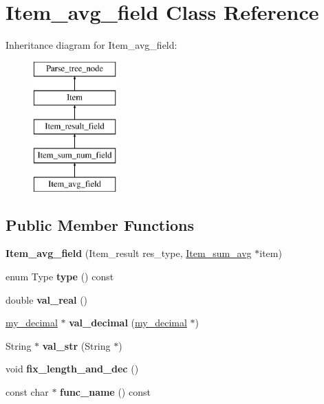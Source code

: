 \hypertarget{classItem__avg__field}{}\section{Item\+\_\+avg\+\_\+field Class Reference}
\label{classItem__avg__field}
Inheritance diagram for Item\+\_\+avg\+\_\+field\+:\begin{figure}[H]
\begin{center}
\leavevmode
\includegraphics[height=5.000000cm]{classItem__avg__field}
\end{center}
\end{figure}
\subsection*{Public Member Functions}
\begin{DoxyCompactItemize}
\item 
\mbox{\label{classItem__avg__field_af691722977d4f8829c858ed6185a979d}} 
{\bfseries Item\+\_\+avg\+\_\+field} (Item\+\_\+result res\+\_\+type, \mbox{\hyperlink{classItem__sum__avg}{Item\+\_\+sum\+\_\+avg}} $\ast$item)
\item 
\mbox{\label{classItem__avg__field_a64dade96542b179754aea6c6e445e486}} 
enum Type {\bfseries type} () const
\item 
\mbox{\label{classItem__avg__field_ace171979bdb67d53358b2cba88ff7168}} 
double {\bfseries val\+\_\+real} ()
\item 
\mbox{\label{classItem__avg__field_a836833d1dc3233d9cf4cc74457c6c68f}} 
\mbox{\hyperlink{classmy__decimal}{my\+\_\+decimal}} $\ast$ {\bfseries val\+\_\+decimal} (\mbox{\hyperlink{classmy__decimal}{my\+\_\+decimal}} $\ast$)
\item 
\mbox{\label{classItem__avg__field_ab05bde67d5fffbba7ba64651ea99c5a5}} 
String $\ast$ {\bfseries val\+\_\+str} (String $\ast$)
\item 
\mbox{\label{classItem__avg__field_a02e2d90f9074f2d0766ab7a58179d0a4}} 
void {\bfseries fix\+\_\+length\+\_\+and\+\_\+dec} ()
\item 
\mbox{\label{classItem__avg__field_a41eb5a8cd622032c9ccfeb72a8e73195}} 
const char $\ast$ {\bfseries func\+\_\+name} () const
\end{DoxyCompactItemize}
